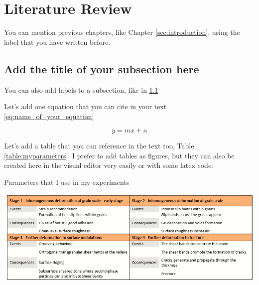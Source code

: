 \section{Literature Review}
\label{sec:litreview}

You can mention previous chapters, like Chapter \ref{sec:introduction}, using the label that you have written before.

\subsection{\textbf{Add the title of your subsection here}}
\label{sec:labelname}

\vspace{0.1 in}
\noindent
You can also add labels to a subsection, like in \ref{sec:labelname}




\vspace{0.1 in}
\noindent


Let's add one equation that you can cite in your text \ref{eq:name_of_your_equation}

\vspace{0.1 in}
\noindent

\begin{equation}
\label{eq:name_of_your_equation}
y = mx + n
\end{equation}


\vspace{0.1 in}
\noindent

Let's add a table that you can reference in the text too, Table \ref{table:myparameters}. I prefer to add tables as figures, but they can also be created here in the visual editor very easily or with some latex code.

\begin{table}[H] %
    \centering
    \caption{Parameters that I use in my experiments}
    \label{table:myparameters}    
    \includegraphics[width=6in]{Figures/LitRev/Stages_table_title.png}
\end{table}

